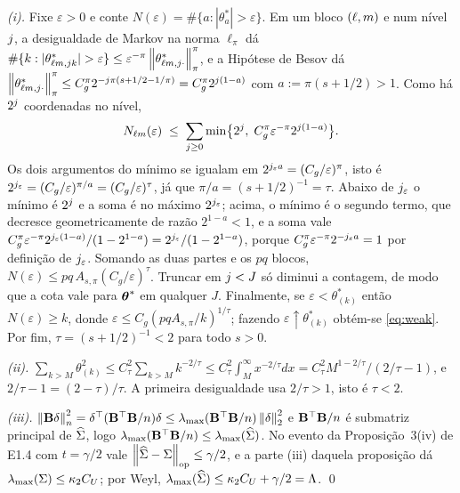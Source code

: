 \documentclass[11pt,a4paper]{article}
\newcommand{\lmaxx}{\lambda_{\max}}
\newcommand{\Bmat}{\mathbf{B}}
\newcommand{\opnorm}[1]{\left\lVert #1 \right\rVert_{\mathrm{op}}}
\begin{document}
\emph{(i).} Fixe $\varepsilon > 0$ e conte
$N(\varepsilon) = \#\{a : |\theta^{*}_{a}| > \varepsilon\}$. Em um bloco
$(\ell,m)$ e num nível $j$, a desigualdade de Markov na norma
$\ell_{\pi}$ dá
$\#\{k : |\theta^{*}_{\ell m,jk}| > \varepsilon\} \le
\varepsilon^{-\pi}\left\lVert \theta^{*}_{\ell m,j\cdot} \right\rVert_{\pi}^{\pi}$, e a
Hipótese de Besov dá
$\left\lVert \theta^{*}_{\ell m,j\cdot} \right\rVert_{\pi}^{\pi} \le C_{g}^{\pi}
2^{-j\pi(s+1/2-1/\pi)} = C_{g}^{\pi}2^{j(1-a)}$ com
$a := \pi(s+1/2) > 1$. Como há $2^{j}$ coordenadas no nível,
\[
  N_{\ell m}(\varepsilon)
  \;\le\; \sum_{j \ge 0}\min\bigl\{2^{j},\;
  C_{g}^{\pi}\varepsilon^{-\pi}2^{j(1-a)}\bigr\}.
\]
Os dois argumentos do mínimo se igualam em $2^{j_{\varepsilon}a} =
(C_{g}/\varepsilon)^{\pi}$, isto é
$2^{j_{\varepsilon}} = (C_{g}/\varepsilon)^{\pi/a} =
(C_{g}/\varepsilon)^{\tau}$, já que $\pi/a = (s+1/2)^{-1} = \tau$. Abaixo de
$j_{\varepsilon}$ o mínimo é $2^{j}$ e a soma é no máximo
$2^{j_{\varepsilon}}$; acima, o mínimo é o segundo termo, que decresce
geometricamente de razão $2^{1-a} < 1$, e a soma vale
$C_{g}^{\pi}\varepsilon^{-\pi}2^{j_{\varepsilon}(1-a)}/(1-2^{1-a}) =
2^{j_{\varepsilon}}/(1-2^{1-a})$, porque
$C_{g}^{\pi}\varepsilon^{-\pi}2^{-j_{\varepsilon}a} = 1$ por definição de
$j_{\varepsilon}$. Somando as duas partes e os $pq$ blocos,
$N(\varepsilon) \le pq\,A_{s,\pi}(C_{g}/\varepsilon)^{\tau}$. Truncar em
$j < J$ só diminui a contagem, de modo que a cota vale para $\boldsymbol{\theta}^{*}$ em
qualquer $J$. Finalmente, se $\varepsilon < \theta^{*}_{(k)}$ então
$N(\varepsilon) \ge k$, donde
$\varepsilon \le C_{g}(pqA_{s,\pi}/k)^{1/\tau}$; fazendo
$\varepsilon \uparrow \theta^{*}_{(k)}$ obtém-se \eqref{eq:weak}. Por fim,
$\tau = (s+1/2)^{-1} < 2$ para todo $s > 0$.

\emph{(ii).} $\sum_{k>M}\theta_{(k)}^{2} \le C_{\tau}^{2}\sum_{k>M}k^{-2/\tau}
\le C_{\tau}^{2}\int_{M}^{\infty}x^{-2/\tau}dx =
C_{\tau}^{2}M^{1-2/\tau}/(2/\tau - 1)$, e $2/\tau - 1 = (2-\tau)/\tau$. A
primeira desigualdade usa $2/\tau > 1$, isto é $\tau < 2$.

\emph{(iii).} $\normn{\Bmat\delta}^{2} = \delta\T(\Bmat\T\Bmat/n)\delta \le
\lmaxx(\Bmat\T\Bmat/n)\norm{\delta}_{2}^{2}$ e $\Bmat\T\Bmat/n$ é submatriz
principal de $\widehat{\Sigma}$, logo $\lmaxx(\Bmat\T\Bmat/n) \le \lmaxx(\Gramhat)$.
No evento da Proposição~3(iv) de E1.4 com $t = \gamma/2$ vale
$\opnorm{\Gramhat - \Gram} \le \gamma/2$, e a parte (iii) daquela proposição dá
$\lmaxx(\Gram) \le \kappa_{2}C_{U}$; por Weyl,
$\lmaxx(\Gramhat) \le \kappa_{2}C_{U}+\gamma/2 = \Lambda$. \qed
\end{document}
